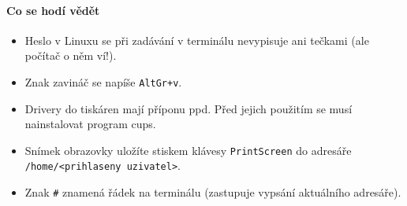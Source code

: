 \paragraph{Co se hodí vědět }

\begin{itemize}
	
	
\item Heslo v Linuxu se při zadávání v terminálu nevypisuje ani tečkami (ale počítač o něm ví!). 

\item Znak zavináč se napíše {\tt AltGr+v}.

\item Drivery do tiskáren mají příponu ppd. Před jejich použitím se musí nainstalovat program cups. 

\item Snímek obrazovky uložíte stiskem klávesy {\tt PrintScreen} do adresáře 
{\tt /home/<prihlaseny uzivatel>}. 

\item Znak {\tt \#} znamená řádek na terminálu (zastupuje vypsání aktuálního adresáře). 	
	
\end{itemize}
